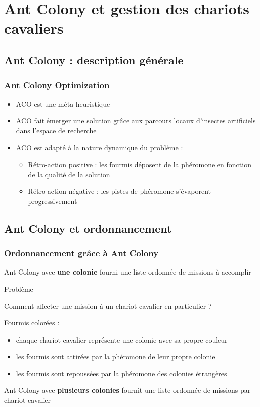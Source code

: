 \documentclass{beamer}
\begin{document}
\section{Ant Colony et gestion des chariots cavaliers}
\subsection*{Ant Colony : description générale}
\begin{frame}
\frametitle{Ant Colony Optimization\cite{Dorigo91}}
	\begin{itemize}
 		\item ACO est une méta-heuristique
		\item ACO fait émerger une solution grâce aux parcours locaux d'insectes artificiels dans l'espace de recherche
		\item ACO est adapté à la nature dynamique du problème :
		\begin{itemize}
		     \item Rétro-action positive : les fourmis déposent de la phéromone en fonction de la qualité de la solution
		     \item Rétro-action négative : les pistes de phéromone s'évaporent progressivement
		\end{itemize}
	\end{itemize}
	
\end{frame}
\subsection*{Ant Colony et ordonnancement}
\begin{frame}
\frametitle{Ordonnancement grâce à Ant Colony}
 	\small
	Ant Colony avec \textbf{une colonie} fourni une liste ordonnée de missions à accomplir
	\pause
	\begin{block}{Problème}
		\begin{center}
			Comment affecter une mission à un chariot cavalier en particulier ?
		\end{center}
	\end{block}

	
	\pause
	
	\begin{block}{Fourmis colorées\cite{Bertelle02} : }
	\begin{itemize}
 		\item chaque chariot cavalier représente une colonie avec sa propre couleur
		\item les fourmis sont attirées par la phéromone de leur propre colonie
		\item les fourmis sont repoussées par la phéromone des colonies étrangères
	\end{itemize}
	\end{block}
	 
  
	\pause
	Ant Colony avec \textbf{plusieurs colonies} fournit une liste ordonnée de missions par chariot cavalier
	\normalsize
\end{frame}
\end{document}
